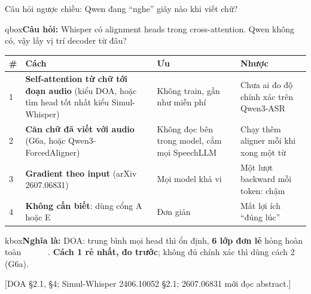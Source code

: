 \documentclass[aspectratio=169,xcolor=table]{beamer}
\newcommand{\bad}[1]{\textcolor{RiskRed}{\textbf{#1}}}
\newcommand{\src}[1]{\par\vfill{\tiny\color{TextGray}[#1]}}
\newcommand{\bsz}{\footnotesize}%
\newcommand{\cauhoi}[1]{\begin{beamercolorbox}[sep=0.30em,rounded=true]{qbox}\bsz\textbf{Câu hỏi:} #1\end{beamercolorbox}\vspace{0.08cm}}
\newcommand{\nghiala}[1]{\begin{beamercolorbox}[sep=0.32em,rounded=true]{kbox}\bsz\textbf{Nghĩa là:} #1\end{beamercolorbox}}
\newcommand{\tagbox}[2]{{\scriptsize\colorbox{#1}{\textcolor{white}{\textbf{#2}}}}}
\newcommand{\PA}{\tagbox{Primary}{paper}}
\begin{document}
\begin{frame}{Câu hỏi ngược chiều: Qwen đang ``nghe'' giây nào khi viết chữ?}\label{fr:decpos}
\cauhoi{Whisper có alignment heads trong cross-attention. Qwen không có, vậy lấy vị trí decoder từ đâu?}
\renewcommand{\arraystretch}{1.05}\footnotesize
\begin{tabular}{C{0.3cm}L{5.0cm}L{3.9cm}L{4.1cm}}
\toprule
\# & Cách & Ưu & Nhược \\
 & \textbf{Self-attention từ chữ tới đoạn audio} (kiểu DOA, hoặc tìm head tốt nhất kiểu Simul-Whisper) & Không train, gần như miễn phí & Chưa ai đo độ chính xác trên Qwen3-ASR \\
2 & \textbf{Căn chữ đã viết với audio} (G6a, hoặc Qwen3-ForcedAligner) & Không đọc bên trong model, cắm mọi SpeechLLM & Chạy thêm aligner mỗi khi xong một từ \\
3 & \textbf{Gradient theo input} (arXiv 2607.06831) & Mọi model khả vi & Một lượt backward mỗi token: chậm \\
4 & \textbf{Không cần biết}: dùng cổng A hoặc E & Đơn giản & Mất lợi ích ``đúng lúc'' \\
\bottomrule
\end{tabular}
\vspace{0.12cm}

\nghiala{DOA: trung bình mọi head thì ổn định, \bad{6 lớp đơn lẻ} hỏng hoàn toàn \PA. \textbf{Cách 1 rẻ nhất, đo trước}; không đủ chính xác thì dùng cách 2 (G6a).}
\src{DOA §2.1, §4; Simul-Whisper 2406.10052 §2.1; 2607.06831 mới đọc abstract.}
\end{frame}

\end{document}

